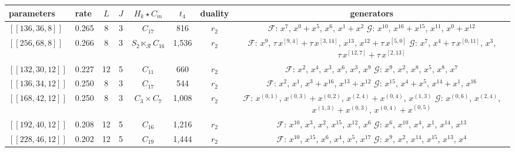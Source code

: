 \begin{table}[t]
\centering
\scriptsize\linespread{1.35}\selectfont
\begin{tabular}{llcccccc}
\toprule
parameters & rate & $L$ & $J$ & $H_k\star C_m$ & $t_4$ & duality & generators \\
\midrule
$[[136, 36, 8]]$ & 0.265 & 8 & 3 & $C_{17}$ & 816 & $r_2$ & \parbox[t]{0.46\textwidth}{\raggedright $\mathcal{F}$: $x^{7}$, $x^{0}{+}x^{5}$, $x^{6}$, $x^{1}{+}x^{2}$ \\ $\mathcal{G}$: $x^{10}$, $x^{16}{+}x^{15}$, $x^{11}$, $x^{0}{+}x^{12}$} \\
$[[256, 68, 8]]$ & 0.266 & 8 & 3 & $S_{2} \ltimes_{\mathcal{R}} C_{16}$ & 1,536 & $r_2$ & \parbox[t]{0.46\textwidth}{\raggedright $\mathcal{F}$: $x^{9}$, $\tau\,x^{[9,4]}{+}\tau\,x^{[3,14]}$, $x^{13}$, $x^{12}{+}\tau\,x^{[5,0]}$ \\ $\mathcal{G}$: $x^{7}$, $x^{4}{+}\tau\,x^{[0,11]}$, $x^{3}$, $\tau\,x^{[12,7]}{+}\tau\,x^{[2,13]}$} \\
$[[132, 30, 12]]$ & 0.227 & 12 & 5 & $C_{11}$ & 660 & $r_2$ & \parbox[t]{0.46\textwidth}{\raggedright $\mathcal{F}$: $x^{2}$, $x^{4}$, $x^{3}$, $x^{6}$, $x^{3}$, $x^{9}$ \\ $\mathcal{G}$: $x^{9}$, $x^{2}$, $x^{8}$, $x^{5}$, $x^{8}$, $x^{7}$} \\
$[[136, 34, 12]]$ & 0.250 & 8 & 3 & $C_{17}$ & 544 & $r_2$ & \parbox[t]{0.46\textwidth}{\raggedright $\mathcal{F}$: $x^{2}$, $x^{1}$, $x^{3}{+}x^{16}$, $x^{13}{+}x^{12}$ \\ $\mathcal{G}$: $x^{15}$, $x^{4}{+}x^{5}$, $x^{14}{+}x^{1}$, $x^{16}$} \\
$[[168, 42, 12]]$ & 0.250 & 8 & 3 & $C_{3}\!\times\!C_{7}$ & 1,008 & $r_2$ & \parbox[t]{0.46\textwidth}{\raggedright $\mathcal{F}$: $x^{(0,1)}$, $x^{(0,3)}{+}x^{(0,2)}$, $x^{(2,4)}{+}x^{(0,4)}$, $x^{(1,3)}$ \\ $\mathcal{G}$: $x^{(0,6)}$, $x^{(2,4)}$, $x^{(1,3)}{+}x^{(0,3)}$, $x^{(0,4)}{+}x^{(0,5)}$} \\
$[[192, 40, 12]]$ & 0.208 & 12 & 5 & $C_{16}$ & 1,216 & $r_2$ & \parbox[t]{0.46\textwidth}{\raggedright $\mathcal{F}$: $x^{10}$, $x^{3}$, $x^{2}$, $x^{15}$, $x^{12}$, $x^{6}$ \\ $\mathcal{G}$: $x^{6}$, $x^{10}$, $x^{4}$, $x^{1}$, $x^{14}$, $x^{13}$} \\
$[[228, 46, 12]]$ & 0.202 & 12 & 5 & $C_{19}$ & 1,444 & $r_2$ & \parbox[t]{0.46\textwidth}{\raggedright $\mathcal{F}$: $x^{10}$, $x^{15}$, $x^{6}$, $x^{4}$, $x^{5}$, $x^{17}$ \\ $\mathcal{G}$: $x^{9}$, $x^{2}$, $x^{14}$, $x^{15}$, $x^{13}$, $x^{4}$} \\

\end{tabular}
\end{table}
